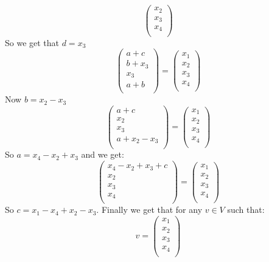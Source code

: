\documentclass[11pt, a4paper]{article}
\begin{document}
\begin{solution}
\begin{enumerate}
\[\begin{pmatrix}
  x_2\\
  x_3\\
  x_4\\
    \end{pmatrix}	
  \]
  So we get that $d=x_3$
  \[
    \begin{pmatrix}
  a+c\\
  b+x_3\\
  x_3\\
  a+b\\
    \end{pmatrix}
    =
    \begin{pmatrix}
  x_1\\
  x_2\\
  x_3\\
  x_4\\
    \end{pmatrix}	
  \]
  Now $b=x_2-x_3$
  \[
    \begin{pmatrix}
  a+c\\
  x_2\\
  x_3\\
  a+x_2-x_3\\
    \end{pmatrix}
    =
    \begin{pmatrix}
  x_1\\
  x_2\\
  x_3\\
  x_4\\
    \end{pmatrix}	
  \]
  So $a = x_4-x_2+x_3$ and we get:
  \[
    \begin{pmatrix}
  x_4-x_2+x_3+c\\
  x_2\\
  x_3\\
  x_4\\
    \end{pmatrix}
    =
    \begin{pmatrix}
  x_1\\
  x_2\\
  x_3\\
  x_4\\
    \end{pmatrix}	
  \]
  So $c = x_1 - x_4 + x_2 - x_3$. Finally we get that for any $v\in V$ such
  that:
  \[
    v =
    \begin{pmatrix}
  x_1\\
  x_2\\
  x_3\\
  x_4\\
    \end{pmatrix}	
\]
\end{enumerate}
\end{solution}
\end{document}
